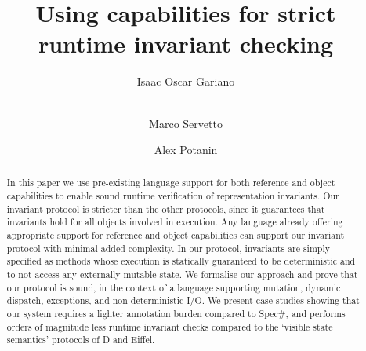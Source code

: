 \documentclass[runningheads]{llncs}
\begin{document}
%
\title{Using capabilities for strict runtime invariant checking}
%
%
\author{Isaac Oscar Gariano \and\\
Marco Servetto \and
Alex Potanin}
%



%

%
\maketitle              %
%
\begin{abstract}
In this paper we use pre-existing language support for both reference and object capabilities to enable sound runtime verification of representation invariants.
Our invariant protocol is stricter than the other  protocols, since it guarantees that invariants hold for all objects involved in execution.
Any language already offering appropriate support for reference and object capabilities can support our invariant protocol with minimal added complexity.
In our protocol, invariants are simply specified as methods whose execution is statically guaranteed to be deterministic and to not access any externally mutable state.
We formalise our approach and prove that our protocol is sound, in the context of a language supporting mutation, dynamic dispatch, exceptions, and non-deterministic I/O.
We present case studies showing that our system requires a lighter annotation burden compared to Spec\#, and performs orders of magnitude less runtime invariant checks compared to the `visible state semantics' protocols of D and Eiffel.




\end{abstract}
%
%
%
\end{document}
